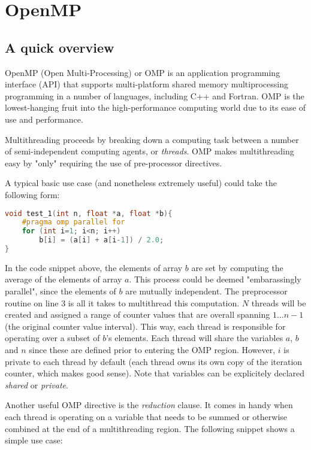 \section{OpenMP}

\subsection{A quick overview}
OpenMP (Open Multi-Processing) or OMP is an application programming interface (API) that supports multi-platform shared memory multiprocessing programming in a number of languages, including C++ and Fortran. OMP is the lowest-hanging fruit into the high-performance computing world due to its ease of use and performance.

Multithreading proceeds by breaking down a computing task between a number of semi-independent computing agents, or \textit{threads}. OMP makes multithreading easy by "only" requiring the use of pre-processor directives.

A typical basic use case (and nonetheless extremely useful) could take the following form:

\begin{lstlisting}[language=C++]
void test_1(int n, float *a, float *b){
	#pragma omp parallel for
 	for (int i=1; i<n; i++)
 		b[i] = (a[i] + a[i-1]) / 2.0;
}
\end{lstlisting}

In the code snippet above, the elements of array $b$ are set by computing the average of the elements of array $a$. This process could be deemed "embarassingly parallel", since the elements of $b$ are mutually independent. The preprocessor routine on line 3 is all it takes to multithread this computation. $N$ threads will be created and assigned a range of counter values that are overall spanning $1 \hdots n - 1$ (the original counter value interval). This way, each thread is responsible for operating over a subset of $b$'s elements. Each thread will share the variables $a$, $b$ and $n$ since these are defined prior to entering the OMP region. However, $i$ is private to each thread by default (each thread owns its own copy of the iteration counter, which makes good sense). Note that variables can be explicitely declared \textit{shared} or \textit{private}.

Another useful OMP directive is the \textit{reduction} clause. It comes in handy when each thread is operating on a variable that needs to be summed or otherwise combined at the end of a multithreading region. The following snippet shows a simple use case:

